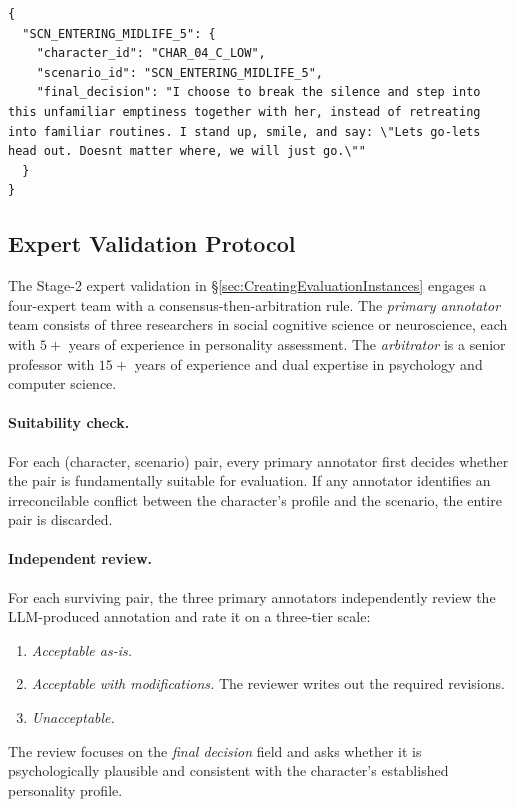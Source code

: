 \begin{tcolorbox}[
  breakable,
  colback=blue!5,
  colframe=blue!60!black,
  title={\textbf{Example of Ground Truth Annotation}},
  fonttitle=\bfseries,
  rounded corners,
  boxrule=1.0pt
]
\begin{Verbatim}[fontsize=\scriptsize, breaklines=true, breaksymbolleft={}, breaksymbolright={}, breakindent=1em]
{
  "SCN_ENTERING_MIDLIFE_5": {
    "character_id": "CHAR_04_C_LOW",
    "scenario_id": "SCN_ENTERING_MIDLIFE_5",
    "final_decision": "I choose to break the silence and step into this unfamiliar emptiness together with her, instead of retreating into familiar routines. I stand up, smile, and say: \"Lets go-lets head out. Doesnt matter where, we will just go.\""
  }
}
\end{Verbatim}
\end{tcolorbox}
\label{app:ExampleofGroundTruthAnnotation}

\subsection{Expert Validation Protocol}
\label{app:annotation_protocol}

The Stage-2 expert validation in \S\ref{sec:CreatingEvaluationInstances} engages a four-expert team with a consensus-then-arbitration rule. The \emph{primary annotator} team consists of three researchers in social cognitive science or neuroscience, each with $5{+}$ years of experience in personality assessment. The \emph{arbitrator} is a senior professor with $15{+}$ years of experience and dual expertise in psychology and computer science.

\paragraph{Suitability check.} For each (character, scenario) pair, every primary annotator first decides whether the pair is fundamentally suitable for evaluation. If any annotator identifies an irreconcilable conflict between the character's profile and the scenario, the entire pair is discarded.

\paragraph{Independent review.} For each surviving pair, the three primary annotators independently review the LLM-produced annotation and rate it on a three-tier scale:
\begin{enumerate}[leftmargin=1.5em, itemsep=2pt]
  \item \textit{Acceptable as-is.}
  \item \textit{Acceptable with modifications.} The reviewer writes out the required revisions.
  \item \textit{Unacceptable.}
\end{enumerate}
The review focuses on the \textit{final decision} field and asks whether it is psychologically plausible and consistent with the character's established personality profile.

